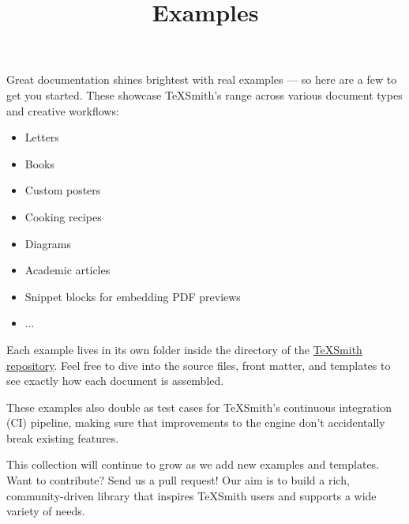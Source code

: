 \documentclass[a4paper,twoside]{article}
\title{Examples}
\author{}\date{}
\begin{document}
\maketitle
Great documentation shines brightest with real examples --- so here are a few to get you started. These showcase TeXSmith's range across various document types and creative workflows:
\begin{itemize}
\item Letters
\item Books
\item Custom posters
\item Cooking recipes
\item Diagrams
\item Academic articles
\item Snippet blocks for embedding PDF previews
\item ...
\end{itemize}
Each example lives in its own folder inside the  directory of the \href{https://github.com/yves-chevallier/texsmith/tree/master/examples}{TeXSmith repository}. Feel free to dive into the source files, front matter, and templates to see exactly how each document is assembled.

These examples also double as test cases for TeXSmith's continuous integration (CI) pipeline, making sure that improvements to the engine don't accidentally break existing features.

This collection will continue to grow as we add new examples and templates. Want to contribute? Send us a pull request! Our aim is to build a rich, community-driven library that inspires TeXSmith users and supports a wide variety of needs.
\end{document}
